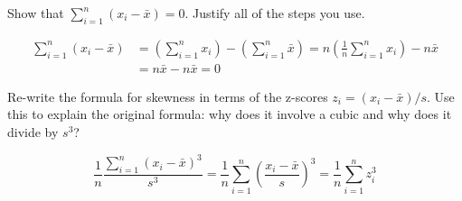 \documentclass[addpoints,12pt]{exam}
\begin{document}
\begin{questions}

  \question Show that $\sum_{i=1}^n (x_i - \bar{x}) = 0$. Justify all of the steps you use.
  \begin{solution}
    \begin{align*}
      \sum_{i=1}^{n} (x_i - \bar{x}) 
      &= \left(\sum_{i=1}^n x_i\right) - \left(\sum_{i=1}^n \bar{x}\right) = n \left(\frac{1}{n}\sum_{i=1}^n x_i\right) - n \bar{x}\\
      &= n \bar{x} - n \bar{x} = 0
    \end{align*}
  \end{solution}

  \question Re-write the formula for skewness in terms of the z-scores $z_i = (x_i - \bar{x})/s$. Use this to explain the original formula: why does it involve a cubic and why does it divide by $s^3$?
  \begin{solution}
    \[
      \frac{1}{n}\frac{\sum_{i=1}^n (x_i - \bar{x})^3}{s^3} = \frac{1}{n} \sum_{i=1}^n \left( \frac{x_i - \bar{x}}{s} \right)^3 = \frac{1}{n} \sum_{i=1}^n z_i^3
    \]
  \end{solution}



\end{questions}
\end{document}

